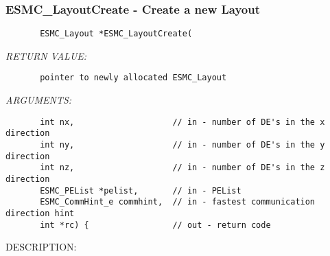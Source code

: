  
\parskip        0pt
\parindent      0pt
\baselineskip  11pt
 
\def\bv{\begin{verbatim}}
\def\ev{\end{verbatim}}
\def\be{\begin{equation}}
\def\ee{\end{equation}}
\def\bea{\begin{eqnarray}}
\def\eea{\end{eqnarray}}
\def\bi{\begin{itemize}}
\def\ei{\end{itemize}}
\def\bn{\begin{enumerate}}
\def\en{\end{enumerate}}
\def\bd{\begin{description}}
\def\ed{\end{description}}
\def\({\left (}
\def\){\right )}
\def\[{\left [}
\def\]{\right ]}
\def\<{\left  \langle}
\def\>{\right \rangle}
\def\cI{{\cal I}}
\def\diag{\mathop{\rm diag}}
\def\tr{\mathop{\rm tr}}


 
\subsubsection{ESMC\_LayoutCreate - Create a new Layout}


  
\begin{verbatim}       ESMC_Layout *ESMC_LayoutCreate(\end{verbatim}{\em RETURN VALUE:}
\begin{verbatim}       pointer to newly allocated ESMC_Layout\end{verbatim}{\em ARGUMENTS:}
\begin{verbatim}       int nx,                    // in - number of DE's in the x direction
       int ny,                    // in - number of DE's in the y direction
       int nz,                    // in - number of DE's in the z direction
       ESMC_PEList *pelist,       // in - PEList
       ESMC_CommHint_e commhint,  // in - fastest communication direction hint
       int *rc) {                 // out - return code\end{verbatim}
{\sf DESCRIPTION:\\ }


